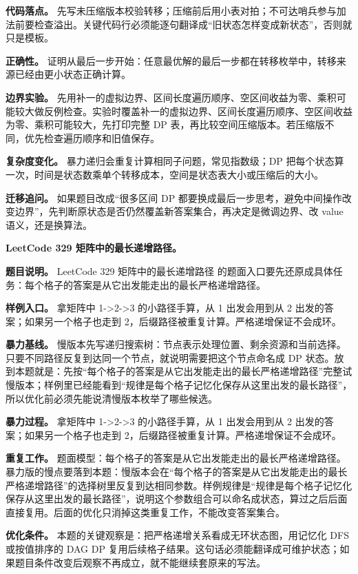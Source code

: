 \textbf{代码落点。} 先写未压缩版本校验转移；压缩前后用小表对拍；不可达哨兵参与加法前要检查溢出。关键代码行必须能逐句翻译成“旧状态怎样变成新状态”，否则就只是模板。

\textbf{正确性。} 证明从最后一步开始：任意最优解的最后一步都在转移枚举中，转移来源已经由更小状态正确计算。

\textbf{边界实验。} 先用补一的虚拟边界、区间长度遍历顺序、空区间收益为零、乘积可能较大做反例检查。实验时覆盖补一的虚拟边界、区间长度遍历顺序、空区间收益为零、乘积可能较大，先打印完整 DP 表，再比较空间压缩版本。若压缩版不同，优先检查遍历顺序和旧值保存。

\textbf{复杂度变化。} 暴力递归会重复计算相同子问题，常见指数级；DP 把每个状态算一次，时间是状态数乘单个转移成本，空间是状态表大小或压缩后的大小。

\textbf{迁移追问。} 如果题目改成“很多区间 DP 都要换成最后一步思考，避免中间操作改变边界”，先判断原状态是否仍然覆盖新答案集合，再决定是微调边界、改 value 语义，还是换算法。

\noindent\textbf{LeetCode 329 矩阵中的最长递增路径。}

\textbf{题目说明。} LeetCode 329 矩阵中的最长递增路径 的题面入口要先还原成具体任务：每个格子的答案是从它出发能走出的最长严格递增路径。

\textbf{样例入口。} 拿矩阵中 1->2->3 的小路径手算，从 1 出发会用到从 2 出发的答案；如果另一个格子也走到 2，后缀路径被重复计算。严格递增保证不会成环。

\textbf{暴力基线。} 慢版本先写递归搜索树：节点表示处理位置、剩余资源和当前选择。只要不同路径反复到达同一个节点，就说明需要把这个节点命名成 DP 状态。放到本题就是：先按“每个格子的答案是从它出发能走出的最长严格递增路径”完整试慢版本；样例里已经能看到“规律是每个格子记忆化保存从这里出发的最长路径”，所以优化前必须先能说清慢版本枚举了哪些候选。

\textbf{暴力过程。} 拿矩阵中 1->2->3 的小路径手算，从 1 出发会用到从 2 出发的答案；如果另一个格子也走到 2，后缀路径被重复计算。严格递增保证不会成环。

\textbf{重复工作。} 题面模型：每个格子的答案是从它出发能走出的最长严格递增路径。暴力版的慢点要落到本题：慢版本会在“每个格子的答案是从它出发能走出的最长严格递增路径”的选择树里反复到达相同参数。样例规律是“规律是每个格子记忆化保存从这里出发的最长路径”，说明这个参数组合可以命名成状态，算过之后后面直接复用。后面的优化只消掉这类重复工作，不能改变答案集合。

\textbf{优化条件。} 本题的关键观察是：把严格递增关系看成无环状态图，用记忆化 DFS 或按值排序的 DAG DP 复用后续格子结果。这句话必须能翻译成可维护状态；如果题目条件改变后观察不再成立，就不能继续套原来的写法。

